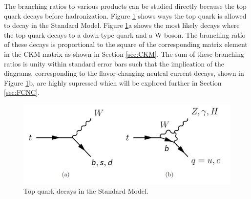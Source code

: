 The branching ratios to various products can be studied directly because the top quark decays before hadronization.  Figure \ref{fig:SMDecays} shows  ways the top quark is allowed to decay in the Standard Model.  Figure \ref{fig:SMDecays}a shows the most likely decays where the top quark decays to a down-type quark and a W boson.  The branching ratio of these decays is proportional to the square of the corresponding matrix element in the CKM matrix as shown in Section \ref{sec:CKM}.  The sum of these branching ratios is unity within standard error bars such that the implication of the diagrams, corresponding to the flavor-changing neutral current decays, shown in Figure \ref{fig:SMDecays}b, are highly supressed which will be explored further in Section \ref{sec:FCNC}.  


\begin{figure}[h!]
	\centering
	\includegraphics[width=\columnwidth]{../ThesisImages/Theory/SMTopDecays.png}
	\caption[Top quark decays in the Standard Model.]{Top quark decays in the Standard Model.}
	\label{fig:SMDecays}
\end{figure}

